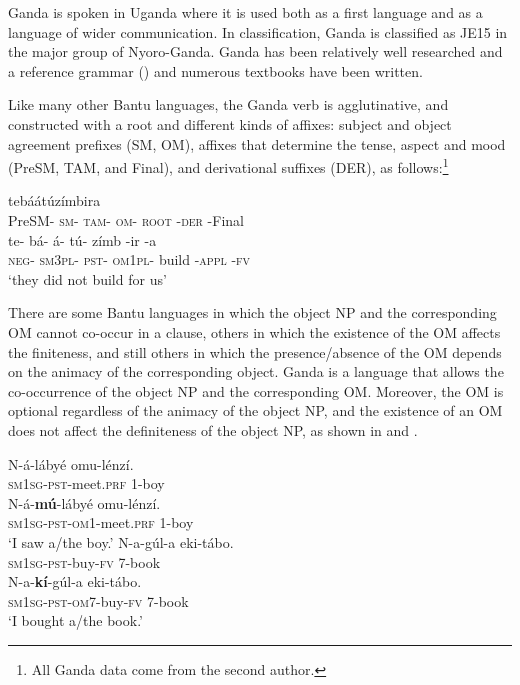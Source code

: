 \documentclass[output=paper,
            colorlinks, citecolor=brown
            ,draftmode
		  ]{langscibook}
\begin{document}
Ganda is spoken in Uganda where it is used both as a first language and as a language of wider communication. In  classification, Ganda is classified as JE15 in the major group of Nyoro-Ganda. Ganda has been relatively well researched and a reference grammar (\citealt{AshtonEtAl1954}) and numerous textbooks have been written. 



Like many other Bantu languages, the Ganda verb is agglutinative, and constructed with a root and different kinds of affixes: subject and object agreement prefixes (SM, OM), affixes that determine the tense, aspect and mood (PreSM, TAM, and Final), and derivational suffixes (DER), as follows:\footnote{All Ganda data come from the second author.} 



\ea%
    \label{ex:yoneda:1}
    tebáátúzímbira\\
    \glll PreSM-  \textsc{sm}-      \textsc{tam}-  \textsc{om}-      \textsc{root}    -\textsc{der}    {}-Final\\
         te-      bá-      á-      tú-        zímb    {}-ir      {}-a\\
         \textsc{neg}-    \textsc{sm3pl}-  \textsc{pst}-  \textsc{om1pl}-    build    {}-\textsc{appl}    {}-\textsc{fv}\\
    \glt ‘they did not build for us’
    \z
      


    There are some Bantu languages in which the object NP and the corresponding OM cannot co-occur in a clause, others in which the existence of the OM affects the finiteness, and still others in which the presence/absence of the OM depends on the animacy of the corresponding object. Ganda is a language that allows the co-occurrence of the object NP and the corresponding OM. Moreover, the OM is optional regardless of the animacy of the object NP, and the existence of an OM does not affect the definiteness of the object NP, as shown in  and .  



\ea%
    \label{ex:yoneda:2}
    \ea\label{ex:yoneda:2a}\gll N-á-lábyé               omu-lénzí.\\
         \textsc{sm1sg-pst}-meet.\textsc{prf}  1-boy\\
    \ex\label{ex:yoneda:2b} \gll N-á-\textbf{mú}{}-lábyé omu-lénzí.\\
    \textsc{sm1sg-pst-om1}-meet.\textsc{prf}    1-boy \\
    \glt ‘I saw a/the boy.’
    \z
\ex%
    \label{ex:yoneda:3}
    \ea\label{ex:yoneda:3a} \gll N-a-gúl-a               eki-tábo. \\
         \textsc{sm1sg-pst}-buy-\textsc{fv}    7-book\\
    \ex\label{ex:yoneda:3b} \gll N-a-\textbf{kí}{}-gúl-a               eki-tábo.\\
    \textsc{sm1sg-pst-om7}-buy-\textsc{fv}    7-book\\
    \glt ‘I bought a/the book.’
    \z
\z
\end{document}
